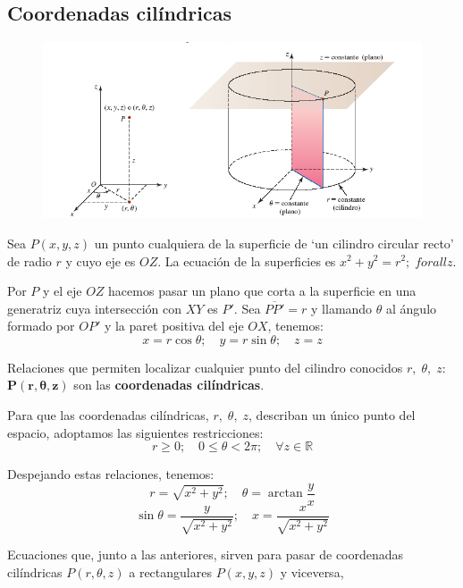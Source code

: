 \subsection{Coordenadas cilíndricas}

\begin{figure}[H]
		\centering
		\includegraphics[width=1\textwidth]{imagenes/imagenes12/T12IM06.png}
	\end{figure}

Sea $P(x,y,z)$ un punto cualquiera de la superficie de `un cilindro circular recto' de radio $r$ y cuyo eje es $OZ$. La ecuación de la superficies es $x^2+y^2=r^2;\; forall z$.

Por $P$ y el eje $OZ$ hacemos pasar un plano que corta a la superficie en una generatriz cuya intersección con $XY$ es $P'$. Sea $\overline{PP'}=r$ y llamando $\theta$ al ángulo formado por $OP'$ y la paret positiva del eje $OX$, tenemos:
$$ x=r\cos \theta;\quad y=r \sin \theta;\quad z=z$$

Relaciones que permiten localizar cualquier punto del cilindro conocidos $r,\; \theta,\; z$: $\boldsymbol{P(r,\theta,z)}$ son las \textbf{coordenadas cilíndricas}.

Para que las coordenadas cilíndricas, $r,\; \theta,\; z$, describan un único punto del espacio, adoptamos las siguientes restricciones:
$$ r\ge 0;\quad 0\le \theta < 2 \pi;\quad \forall z \in \mathbb R$$

Despejando estas relaciones, tenemos:
$$r=\sqrt{x^2+y^2}; \quad \theta=\arctan \dfrac y x$$
$$\sin \theta=\dfrac y {\sqrt{x^2+y^2}};\quad x= \dfrac x {\sqrt{x^2+y^2}}$$


 Ecuaciones que, junto a las anteriores, sirven para pasar de coordenadas cilíndricas $P(r, \theta, z)$ a rectangulares $P(x,y,z)$ y viceversa,

